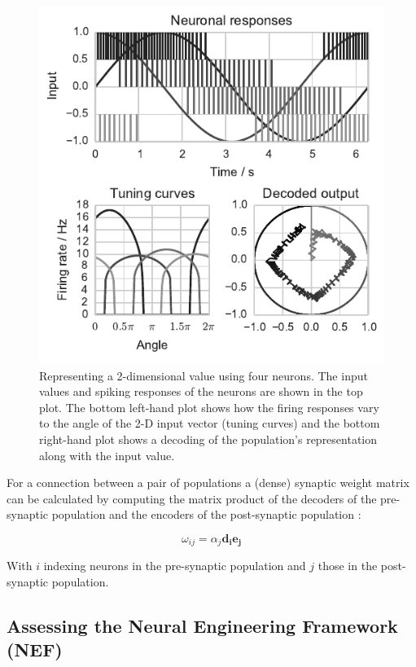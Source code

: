\documentclass[conference]{IEEEtran}
\renewcommand{\vec}{\mathbf}  %
\begin{document}
  \begin{figure}[!t]
    \includegraphics{figures/nef-1}
    \caption{Representing a 2-dimensional value using four neurons. The input values and spiking responses of the neurons are shown in the top plot. The bottom left-hand plot shows how the firing responses vary to the angle of the 2-D input vector (tuning curves) and the bottom right-hand plot shows a decoding of the population's representation along with the input value.}
    \label{fig:background/nef-1}
  \end{figure}

For a connection between a pair of populations a (dense) synaptic weight matrix can be calculated by computing the matrix product of the decoders of the pre-synaptic population and the encoders of the post-synaptic population \parencite{Stewart2014}:

\begin{equation}
  \omega_{ij} = \alpha_j \vec{d_i}\vec{e_j}  \label{eq:weights}
\end{equation}

With $i$ indexing neurons in the pre-synaptic population and $j$ those in the post-synaptic population.

  \subsection{Assessing the Neural Engineering Framework (NEF)}
  \label{sef:background/assessing}
\end{document}
